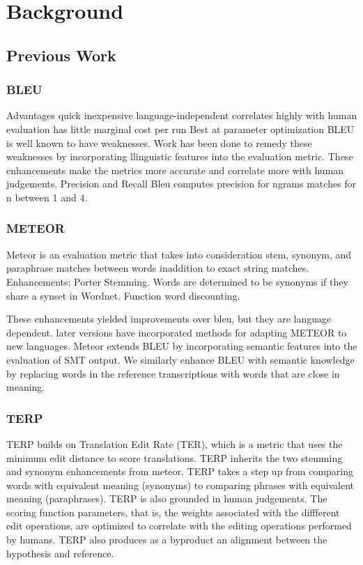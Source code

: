 
\section{Background}
\label{sec:background}

\subsection{Previous Work}
\label{sec:prevwork}


\subsubsection{BLEU}
\label{sec:bleu}


Advantages
quick
inexpensive
language-independent
correlates highly with human evaluation
has little marginal cost per run
Best at parameter optimization
BLEU is well known to have weaknesses. 
Work has been done to remedy these weaknesses by incorporating llinguistic features into the evaluation metric. 
These enhancements make the metrics more accurate and correlate more with human judgements.
Precision and Recall
Bleu computes precision for ngrams matches for n between 1 and 4. 

\subsubsection{METEOR}
\label{sec:meteor}


Meteor is an evaluation metric that takes into consideration stem, synonym, and paraphrase matches between words inaddition to exact string matches.
Enhancements:
Porter Stemming.
Words  are determined to  be synonyms if they share a synset in Wordnet. 
Function word discounting.

These enhancements yielded improvements over bleu, but they are language dependent. 
later versions have incorporated methods for adapting METEOR to new languages. 
Meteor extends BLEU by incorporating semantic features into the evaluation of SMT output. 
We similarly enhance BLEU with semantic knowledge by replacing words in the reference transcriptions with words that are close in meaning.

\subsubsection{TERP}
\label{sec:terp}


TERP builds on Translation Edit Rate (TER), which is a metric that uses the minimum edit distance to score translations. 
TERP inherits the two stemming and synonym enhancements from meteor. 
TERP takes a step up from comparing words with equivalent meaning    (synonyms) to comparing phrases with equivalent meaning (paraphrases). 
TERP is also grounded in human judgements. 
The scoring function parameters, that is, the weights associated with the diffferent edit operations, are optimized  to correlate with the  editing operations performed by humans. 
TERP also produces as a byproduct an alignment between the hypothesis and reference. 

